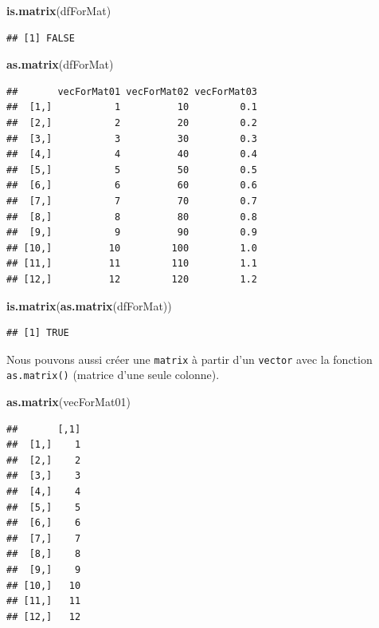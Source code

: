 \documentclass[
]{book}
\newenvironment{Shaded}{\begin{snugshade}}{\end{snugshade}}
\newcommand{\KeywordTok}[1]{\textcolor[rgb]{0.13,0.29,0.53}{\textbf{#1}}}
\newcommand{\NormalTok}[1]{#1}
\begin{document}
\begin{Shaded}
\begin{Highlighting}[]
\KeywordTok{is.matrix}\NormalTok{(dfForMat)}
\end{Highlighting}
\end{Shaded}

\begin{verbatim}
## [1] FALSE
\end{verbatim}

\begin{Shaded}
\begin{Highlighting}[]
\KeywordTok{as.matrix}\NormalTok{(dfForMat)}
\end{Highlighting}
\end{Shaded}

\begin{verbatim}
##       vecForMat01 vecForMat02 vecForMat03
##  [1,]           1          10         0.1
##  [2,]           2          20         0.2
##  [3,]           3          30         0.3
##  [4,]           4          40         0.4
##  [5,]           5          50         0.5
##  [6,]           6          60         0.6
##  [7,]           7          70         0.7
##  [8,]           8          80         0.8
##  [9,]           9          90         0.9
## [10,]          10         100         1.0
## [11,]          11         110         1.1
## [12,]          12         120         1.2
\end{verbatim}

\begin{Shaded}
\begin{Highlighting}[]
\KeywordTok{is.matrix}\NormalTok{(}\KeywordTok{as.matrix}\NormalTok{(dfForMat))}
\end{Highlighting}
\end{Shaded}

\begin{verbatim}
## [1] TRUE
\end{verbatim}

Nous pouvons aussi créer une \texttt{matrix} à partir d'un \texttt{vector} avec la fonction \texttt{as.matrix()} (matrice d'une seule colonne).

\begin{Shaded}
\begin{Highlighting}[]
\KeywordTok{as.matrix}\NormalTok{(vecForMat01)}
\end{Highlighting}
\end{Shaded}

\begin{verbatim}
##       [,1]
##  [1,]    1
##  [2,]    2
##  [3,]    3
##  [4,]    4
##  [5,]    5
##  [6,]    6
##  [7,]    7
##  [8,]    8
##  [9,]    9
## [10,]   10
## [11,]   11
## [12,]   12
\end{verbatim}
\end{document}
